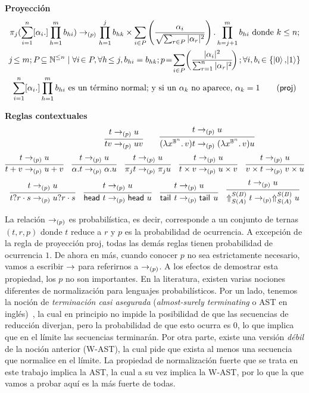\textbf{Proyección}
\begin{multline*}
	\proj{j}{(\sum\limits_{i = 1}^n [\alpha_i .] \prod_{h = 1}^m b_{hi})} \reducesto_{(p)} \prod_{h = 1}^j b_{hk} \times \sum\limits_{i \in P} \left(\frac{\alpha_i}{\sqrt{\sum_{r \in P} |\alpha_r|^2}}\right) . \prod_{h = j + 1}^m b_{hi} \text{ donde } k \leq n; \\
	j\!\leq m; P\!\subseteq \mathbb{N}^{\leq n} \mid \forall i\!\in P, \forall h\!\leq j, b_{hi} = b_{hk}; p\!=\!\sum_{i \in P}\!\left( \frac{|\alpha_i|^2}{\sum_{r = 1}^n |\alpha_r|^2}\!\right);
	\forall i, b_i\!\in \{\ket{0},\!\ket{1}\} \\ \sum_{i = 1}^n [\alpha_i .] \prod_{h = 1}^m b_{hi} \text{ es un término normal; y si un } \alpha_k \text{ no aparece, } \alpha_k = 1
	\tag{\textsf{proj}}
\end{multline*}

\textbf{Reglas contextuales}
\[
	\quad\quad\quad\quad\quad\quad
	\infer{\app{t}{v} \reducesto_{(p)} \app{u}{v}}{t \reducesto_{(p)} u}
	\quad\quad
	\infer{\app{(\abstr{\vrbl{x}{\qubittype^n}}{v})}{t} \reducesto_{(p)} \app{(\abstr{\vrbl{x}{\qubittype^n}}{v})}{u}}{t \reducesto_{(p)} u}
\]
\[
	\infer{t + v \reducesto_{(p)} u + v}{t \reducesto_{(p)} u}
	\quad
	\infer{\alpha . t \reducesto_{(p)} \alpha . u}{t \reducesto_{(p)} u}
	\quad
	\infer{\proj{j}{t} \reducesto_{(p)} \proj{j}{u}}{t \reducesto_{(p)} u}
	\quad
	\infer{t \times v \reducesto_{(p)} u \times v}{t \reducesto_{(p)} u}
	\quad
	\infer{v \times t \reducesto_{(p)} v \times u}{t \reducesto_{(p)} u}
\]
\[
	\infer{\ifte{t}{r}{s} \reducesto_{(p)} \ifte{u}{r}{s}}{t \reducesto_{(p)} u}
	\quad
	\infer{\head{t} \reducesto_{(p)} \head{u}}{t \reducesto_{(p)} u}
	\quad
	\infer{\tail{t} \reducesto_{(p)} \tail{u}}{t \reducesto_{(p)} u}
	\quad
	\infer{\cast{S(A)}{S(B)} t \reducesto_{(p)} \cast{S(A)}{S(B)} u}{t \reducesto_{(p)} u}
\]

La relación \( \rightarrow_{(p)} \) es probabilística, es decir, corresponde a un conjunto de ternas \( (t, r, p) \) donde \( t \) reduce a \( r \) y \( p \) es la probabilidad de ocurrencia. A excepción de la regla de proyección \textsf{proj}, todas las demás reglas tienen probabilidad de ocurrencia \( 1 \). De ahora en más, cuando conocer \( p \) no sea estrictamente necesario, vamos a escribir \( \rightarrow \) para referirnos a \( \rightarrow_{(p)} \). A los efectos de demostrar esta propiedad, los \( p \) no son importantes. En la literatura, existen varias nociones diferentes de normalización para lenguajes probabilísticos. Por un lado, tenemos la noción de \textit{terminación casi asegurada} (\textit{almost-surely terminating} o AST en inglés)~\cite{ast}, la cual en principio no impide la posibilidad de que las secuencias de reducción diverjan, pero la probabilidad de que esto ocurra es 0, lo que implica que en el límite las secuencias terminarán. Por otra parte, existe una versión \textit{débil} de la noción anterior (W-AST), la cual pide que exista al menos una secuencia que normalice en el límite. La propiedad de normalización fuerte que se trata en este trabajo implica la AST, la cual a su vez implica la W-AST, por lo que la que vamos a probar aquí es la más fuerte de todas.

